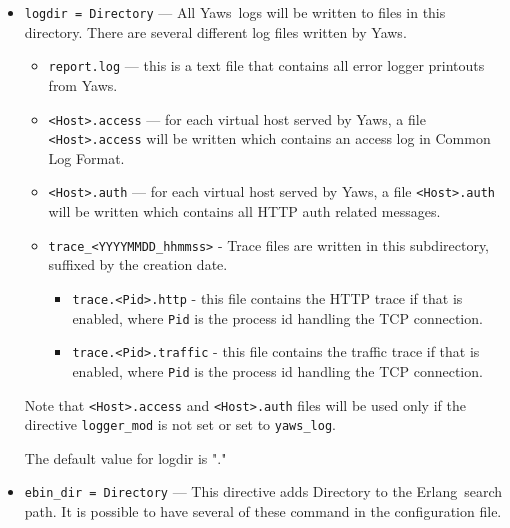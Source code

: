 \documentclass[11pt,oneside,english]{book}
\newcommand{\Erlang}            %
        {{\sc Erlang}}
\newcommand{\Yaws}            %
        {{\sc Yaws}}
\begin{document}
\begin{itemize}


\item       \verb+logdir = Directory+ ---
              All \Yaws\  logs will be  written  to  files  in  this
              directory.  There  are  several different log files
              written by \Yaws{}.

              \begin{itemize}
              \item \verb+report.log+ --- this is a text file that contains  all
              error logger printouts from \Yaws{}.
              \item \verb+<Host>.access+ --- for each virtual host
                served by \Yaws{}, a file \verb+<Host>.access+ will be
                written which contains an access log in Common Log
                Format.
              \item \verb+<Host>.auth+ --- for each virtual host served by
              \Yaws{}, a file \verb+<Host>.auth+ will be written which
              contains all HTTP auth related messages.
              \item \verb+trace_<YYYYMMDD_hhmmss>+ - Trace files are written in
              this subdirectory, suffixed by the creation date.
              \begin{itemize}
              \item \verb+trace.<Pid>.http+ - this file contains the HTTP
              trace if that is enabled, where \verb+Pid+ is the process id
              handling the TCP connection.
              \item \verb+trace.<Pid>.traffic+ - this file contains the
              traffic trace if that is enabled, where \verb+Pid+ is the
              process id handling the TCP connection.
              \end{itemize}
              \end{itemize}

              Note that \verb+<Host>.access+ and \verb+<Host>.auth+ files will
              be used only if the directive \verb+logger_mod+ is not set or set
              to \verb+yaws_log+.

              The default value for logdir is "."

\item        \verb+ebin_dir = Directory+ ---
              This  directive adds Directory to the \Erlang\  search
              path. It is possible to have several of these  command
              in the configuration file.


\end{itemize}
\end{document}
